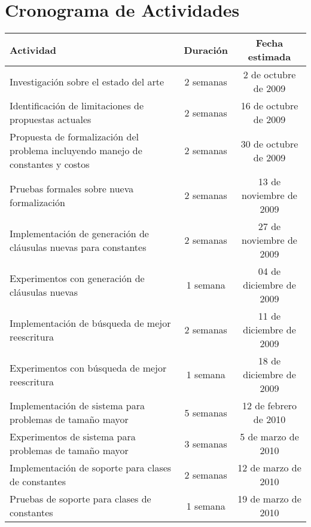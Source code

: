 \section{Cronograma de Actividades}

\begin{tabular}{|p{8cm}|c|c|}
\hline
Actividad & Duración & Fecha estimada \\
\hline
\hline
Investigación sobre el estado del arte & 2 semanas & 2 de octubre de 2009\\
\hline
Identificación de limitaciones de propuestas actuales & 2 semanas & 16 de octubre de 2009\\
\hline
Propuesta de formalización del problema incluyendo manejo de constantes y costos & 2 semanas & 30 de octubre de 2009 \\
\hline
Pruebas formales sobre nueva formalización & 2 semanas &  13 de noviembre de 2009 \\
\hline
Implementación de generación de cláusulas nuevas para constantes & 2 semanas & 27 de noviembre de 2009 \\
\hline
Experimentos con generación de cláusulas nuevas & 1 semana & 04 de diciembre de 2009 \\
\hline
Implementación de búsqueda de mejor reescritura & 2 semanas & 11 de diciembre de 2009 \\
\hline
Experimentos con búsqueda de mejor reescritura & 1 semana & 18 de diciembre de 2009 \\
\hline
Implementación de sistema para problemas de tamaño mayor & 5 semanas & 12 de febrero de 2010 \\
\hline
Experimentos de sistema para problemas de tamaño mayor & 3 semanas & 5 de marzo de 2010 \\
\hline
Implementación de soporte para clases de constantes & 2 semanas & 12 de marzo de 2010 \\
\hline
Pruebas de soporte para clases de constantes & 1 semana & 19 de marzo de 2010 \\
\hline
\end{tabular}
